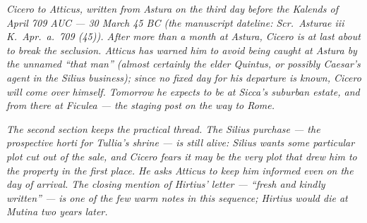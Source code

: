 
\textit{Cicero to Atticus, written from Astura on the
third day before the Kalends of April 709 AUC ---
30 March 45 BC (the manuscript dateline: \textit{Scr.\
Asturae iii K.\ Apr.\ a.\ 709 (45)}). After more
than a month at Astura, Cicero is at last about to
break the seclusion. Atticus has warned him to
avoid being caught at Astura by the unnamed
``that man'' (almost certainly the elder Quintus,
or possibly Caesar's agent in the Silius business);
since no fixed day for his departure is known,
Cicero will come over himself. Tomorrow he expects
to be at Sicca's suburban estate, and from there at
Ficulea --- the staging post on the way to Rome.}

\textit{The second section keeps the practical thread.
The Silius purchase --- the prospective \textit{horti}
for Tullia's shrine --- is still alive: Silius wants
some particular plot cut out of the sale, and Cicero
fears it may be the very plot that drew him to the
property in the first place. He asks Atticus to keep
him informed even on the day of arrival. The closing
mention of Hirtius' letter --- ``fresh and kindly
written'' --- is one of the few warm notes in this
sequence; Hirtius would die at Mutina two years later.}

